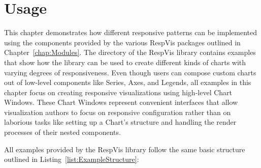 \chapter{Usage}
\label{chap:Usage}

This chapter demonstrates how different responsive patterns can be implemented using the components provided by the various RespVis packages outlined in Chapter~\ref{chap:Modules}.
The  directory of the RespVis library contains examples that show how the library can be used to create different kinds of charts with varying degrees of responsiveness.
Even though users can compose custom charts out of low-level components like Series, Axes, and Legends, all examples in this chapter focus on creating responsive visualizations using high-level Chart Windows.
These Chart Windows represent convenient interfaces that allow visualization authors to focus on responsive configuration rather than on laborious tasks like setting up a Chart's structure and handling the render processes of their nested components.

All examples provided by the RespVis library follow the same basic structure outlined in Listing~\ref{list:ExampleStructure}:

